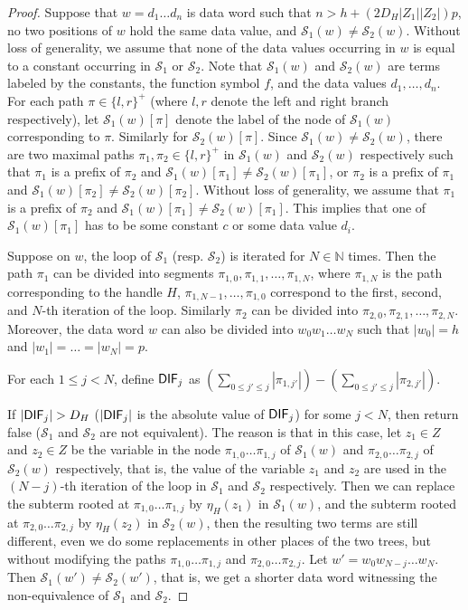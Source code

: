 \documentclass[runningheads,a4paper]{llncs}
\newcommand\nat{\mathbb{N}}
\newcommand\Ss{\mathcal{S}}
\begin{document}
\begin{proof}
Suppose that $w = d_1 \dots d_n$ is data word such that $n > h+(2D_H |Z_1|  |Z_2|)p$, no two positions of $w$ hold the same data value, and $\Ss_1(w) \neq \Ss_2(w)$. Without loss of generality, we assume that none of the data values occurring in $w$ is equal to a constant occurring in $\Ss_1$ or $\Ss_2$.  Note that $\Ss_1(w)$ and $\Ss_2(w)$ are terms labeled by the constants, the function symbol $f$, and the data values $d_1,\dots,d_n$. For each path $\pi \in \{l, r\}^+$ (where $l,r$ denote the left and right branch respectively), let $\Ss_1(w)[\pi]$ denote the label of the node of $\Ss_1(w)$ corresponding to $\pi$. Similarly for $\Ss_2(w)[\pi]$. Since $\Ss_1(w) \neq \Ss_2(w)$, there are two maximal paths $\pi_1,\pi_2 \in \{l, r\}^+$ in $\Ss_1(w)$ and $\Ss_2(w)$ respectively such that $\pi_1$ is a prefix of $\pi_2$ and $\Ss_1(w)[\pi_1] \neq \Ss_2(w)[\pi_1]$, or $\pi_2$ is a prefix of $\pi_1$ and $\Ss_1(w)[\pi_2] \neq \Ss_2(w)[\pi_2]$. Without loss of generality, we assume that $\pi_1$ is a prefix of $\pi_2$ and $\Ss_1(w)[\pi_1] \neq \Ss_2(w)[\pi_1]$. 
This implies that one of $\Ss_1(w)[\pi_1]$ has to be some constant $c$ or some data value $d_i$.


Suppose on $w$, the loop of $\Ss_1$ (resp. $\Ss_2$) is iterated for $N \in \nat$ times.  Then the path $\pi_1$ can be divided into segments $\pi_{1,0}, \pi_{1,1}, \dots, \pi_{1,N}$, where $\pi_{1,N}$ is the path corresponding to the handle $H$, $\pi_{1,N-1}, \dots, \pi_{1,0}$ correspond to the first, second, and $N$-th iteration of the loop. Similarly $\pi_2$ can be divided into $\pi_{2,0}, \pi_{2,1}, \dots, \pi_{2,N}$. Moreover, the data word $w$ can also be divided into $w_0 w_1 \dots w_N$ such that $|w_0| = h$ and $|w_1|=\dots = |w_N|=p$.

For each $1 \le j < N$, define ${\sf DIF}_{j}$ as $ (\sum \limits_{0 \le j' \le j} |\pi_{1,j'}|) - (\sum \limits_{0 \le j' \le j} |\pi_{2,j'}|) $. 

If $|{\sf DIF}_j| > D_H$ ($|{\sf DIF}_j|$ is the absolute value of ${\sf DIF}_j$) for some $j < N$, then return false ($\Ss_1$ and $\Ss_2$ are not equivalent). The reason is that in this case, let $z_1 \in Z$  and $z_2 \in Z$ be the variable in the node $\pi_{1,0} \dots \pi_{1,j}$ of $\Ss_1(w)$ and  $\pi_{2,0} \dots \pi_{2,j}$ of $\Ss_2(w)$ respectively, that is, the value of the variable $z_1$ and $z_2$ are used in the $(N-j)$-th iteration of the loop in $\Ss_1$ and $\Ss_2$ respectively. Then we can replace the subterm rooted at $\pi_{1,0} \dots \pi_{1,j}$ by $\eta_H(z_1)$ in $\Ss_1(w)$, and the subterm rooted at $\pi_{2,0} \dots \pi_{2,j}$ by $\eta_H(z_2)$ in $\Ss_2(w)$, then the resulting two terms are still different, even we do some replacements in other places of the two trees, but without modifying the paths $\pi_{1,0} \dots \pi_{1, j}$  and $\pi_{2,0} \dots \pi_{2, j}$.  Let  $w' = w_0 w_{N-j} \dots w_N$. Then $\Ss_1(w') \neq \Ss_2(w')$, that is, we get a shorter data word witnessing the non-equivalence of $\Ss_1$ and $\Ss_2$.


\end{proof}
\end{document}
